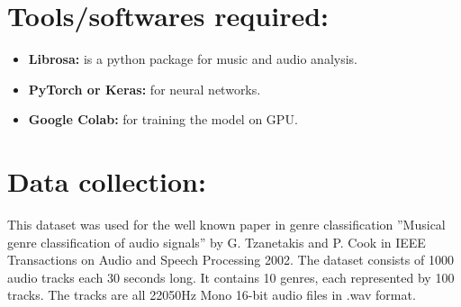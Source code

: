 \documentclass[]{report}
\begin{document}
\section{Tools/softwares required:}
\begin{itemize}
	\item \textbf{Librosa:} is a python package for music and audio analysis.
	\item \textbf{PyTorch or Keras:} for neural networks. 
	\item \textbf{Google Colab:} for training the model on GPU. 
	
\end{itemize}
\section{Data collection:}
This dataset was used for the well known paper in genre classification ”Musical
genre classification of audio signals” by G. Tzanetakis and P. Cook in IEEE
Transactions on Audio and Speech Processing 2002. The dataset consists of
1000 audio tracks each 30 seconds long. It contains 10 genres, each represented
by 100 tracks. The tracks are all 22050Hz Mono 16-bit audio files in .wav format.
\end{document}
